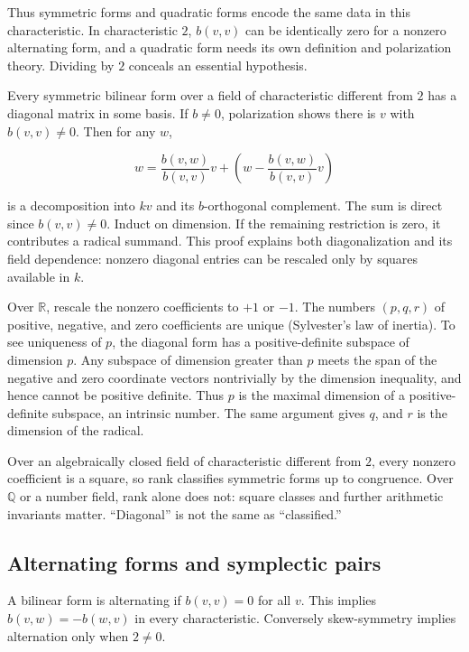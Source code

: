 \documentclass[
  11pt,
]{article}
\begin{document}
Thus symmetric forms and quadratic forms encode the same data in this
characteristic. In characteristic \(2\), \(b(v,v)\) can be identically
zero for a nonzero alternating form, and a quadratic form needs its own
definition and polarization theory. Dividing by \(2\) conceals an
essential hypothesis.

Every symmetric bilinear form over a field of characteristic different
from \(2\) has a diagonal matrix in some basis. If \(b\ne0\),
polarization shows there is \(v\) with \(b(v,v)\ne0\). Then for any
\(w\),

\[w=\frac{b(v,w)}{b(v,v)}v+
\left(w-\frac{b(v,w)}{b(v,v)}v\right)\]

is a decomposition into \(kv\) and its \(b\)-orthogonal complement. The
sum is direct since \(b(v,v)\ne0\). Induct on dimension. If the
remaining restriction is zero, it contributes a radical summand. This
proof explains both diagonalization and its field dependence: nonzero
diagonal entries can be rescaled only by squares available in \(k\).

Over \(\mathbb R\), rescale the nonzero coefficients to \(+1\) or
\(-1\). The numbers \((p,q,r)\) of positive, negative, and zero
coefficients are unique (Sylvester's law of inertia). To see uniqueness
of \(p\), the diagonal form has a positive-definite subspace of
dimension \(p\). Any subspace of dimension greater than \(p\) meets the
span of the negative and zero coordinate vectors nontrivially by the
dimension inequality, and hence cannot be positive definite. Thus \(p\)
is the maximal dimension of a positive-definite subspace, an intrinsic
number. The same argument gives \(q\), and \(r\) is the dimension of the
radical.

Over an algebraically closed field of characteristic different from
\(2\), every nonzero coefficient is a square, so rank classifies
symmetric forms up to congruence. Over \(\mathbb Q\) or a number field,
rank alone does not: square classes and further arithmetic invariants
matter. ``Diagonal'' is not the same as ``classified.''

\subsection{Alternating forms and symplectic
pairs}\label{alternating-forms-and-symplectic-pairs}

A bilinear form is alternating if \(b(v,v)=0\) for all \(v\). This
implies \(b(v,w)=-b(w,v)\) in every characteristic. Conversely
skew-symmetry implies alternation only when \(2\ne0\).
\end{document}

